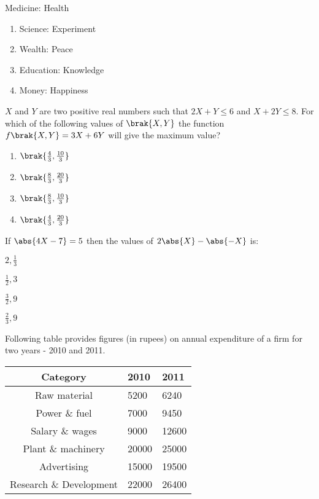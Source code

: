 Medicine: Health
\begin{enumerate}
\item Science: Experiment
\item Wealth: Peace
\item Education: Knowledge
\item Money: Happiness
\end{enumerate}
\item $X$ and $Y$ are two positive real numbers such that $2X + Y \leq 6$ and $X + 2Y \leq 8$. For which of the following values  of $\brak{X,Y}$ the function $f\brak{X,Y} = 3X + 6Y$ will give the maximum value?
\begin{enumerate}
\item $\brak{\frac{4}{3},\frac{10}{3}}$
\item $\brak{\frac{8}{3},\frac{20}{3}}$
\item $\brak{\frac{8}{3},\frac{10}{3}}$
\item $\brak{\frac{4}{3},\frac{20}{3}}$
\end{enumerate}
\item If $\abs{4X-7} = 5$ then the values of $2\abs{X}-\abs{-X}$ is:
\begin{enumerate}
\begin{multicols}{4}
\item $2,\frac{1}{3}$
\item $\frac{1}{2}, 3$
\item $\frac{3}{2},9$
\item $\frac{2}{3},9$
\end{multicols}
\end{enumerate}
\item Following table provides figures (in rupees) on annual expenditure of a firm for two years - 2010
and 2011.
\begin{table}[H]
    \centering
    \begin{tabular}{|c|p{1.5cm}|p{1.5cm}|}
    \hline
    Category &  2010 & 2011 \\
    \hline
    Raw material & 5200 & 6240 \\ 
    \hline
    Power \& fuel & 7000 & 9450 \\ 
    \hline
    Salary \& wages & 9000 & 12600 \\ 
    \hline
    Plant \& machinery & 20000 & 25000 \\ 
    \hline
    Advertising & 15000 & 19500 \\ 
    \hline
    Research \& Development & 22000 & 26400 \\ 
    \hline
\end{tabular}
\end{table}
